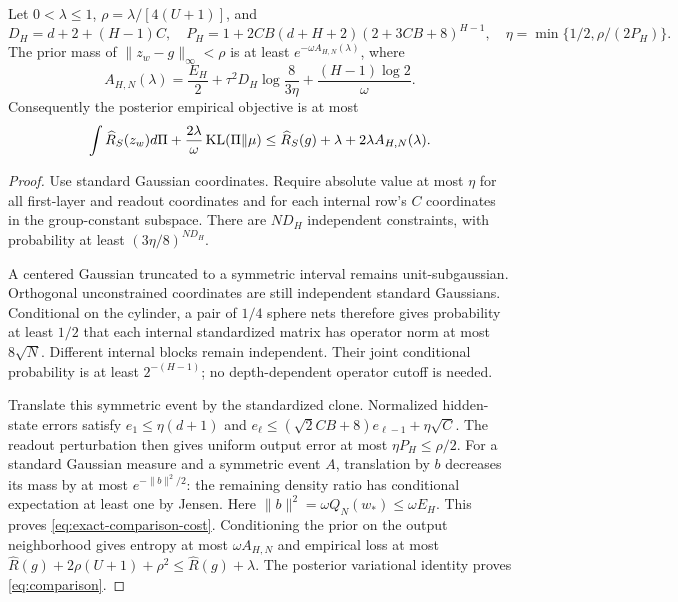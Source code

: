 \documentclass[11pt]{article}
\begin{document}
\begin{lemma}
\label{lem:teacher}
Let $0<\lambda\le1$, $\rho=\lambda/[4(U+1)]$, and
\[
 D_H=d+2+(H-1)C,\quad
 P_H=1+2CB(d+H+2)(2+3CB+8)^{H-1},\quad
 \eta=\min\{1/2,\rho/(2P_H)\}.
\]
The prior mass of $\|z_w-g\|_\infty<\rho$ is at least $e^{-\omega A_{H,N}(\lambda)}$, where
\begin{equation}
 A_{H,N}(\lambda)=\frac{E_H}{2}
     +\tau^2D_H\log\frac8{3\eta}
     +\frac{(H-1)\log2}{\omega}.
 \label{eq:exact-comparison-cost}
\end{equation}
Consequently the posterior empirical objective is at most
\begin{equation}
 \int\widehat R_S(z_w)d\Pi+\frac{2\lambda}{\omega}\operatorname{KL}(\Pi\Vert\mu)
 \le\widehat R_S(g)+\lambda+2\lambda A_{H,N}(\lambda).
 \label{eq:comparison}
\end{equation}
\end{lemma}
\begin{proof}
Use standard Gaussian coordinates. Require absolute value at most $\eta$ for all first-layer and readout coordinates and for each internal row's $C$ coordinates in the group-constant subspace. There are $ND_H$ independent constraints, with probability at least $(3\eta/8)^{ND_H}$.

A centered Gaussian truncated to a symmetric interval remains unit-subgaussian. Orthogonal unconstrained coordinates are still independent standard Gaussians. Conditional on the cylinder, a pair of $1/4$ sphere nets therefore gives probability at least $1/2$ that each internal standardized matrix has operator norm at most $8\sqrt N$. Different internal blocks remain independent. Their joint conditional probability is at least $2^{-(H-1)}$; no depth-dependent operator cutoff is needed.

Translate this symmetric event by the standardized clone. Normalized hidden-state errors satisfy
$e_1\le\eta(d+1)$ and
$e_\ell\le(\sqrt2CB+8)e_{\ell-1}+\eta\sqrt C$.
The readout perturbation then gives uniform output error at most $\eta P_H\le\rho/2$. For a standard Gaussian measure and a symmetric event $A$, translation by $b$ decreases its mass by at most $e^{-\|b\|^2/2}$: the remaining density ratio has conditional expectation at least one by Jensen. Here $\|b\|^2=\omega Q_N(w_*)\le\omega E_H$. This proves \eqref{eq:exact-comparison-cost}. Conditioning the prior on the output neighborhood gives entropy at most $\omega A_{H,N}$ and empirical loss at most $\widehat R(g)+2\rho(U+1)+\rho^2\le\widehat R(g)+\lambda$. The posterior variational identity proves \eqref{eq:comparison}.
\end{proof}
\end{document}
